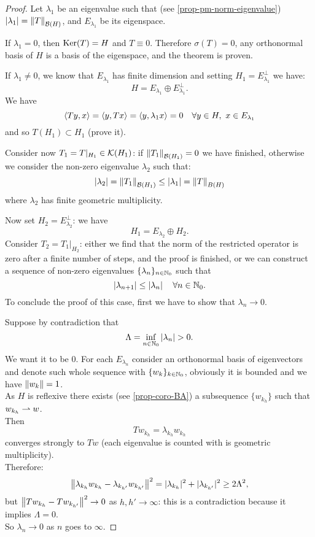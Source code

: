 \begin{proof}
	Let $\lambda_1$ be an eigenvalue such that (see \vref{prop-pm-norm-eigenvalue}) $|\lambda_1|= \left\lVert T\right\rVert_{\mathcal B(H)}$, and $E_{\lambda_1}$ be its eigenspace.
	
	If $\lambda_1 = 0$, then $\operatorname{Ker}(T) = H$ and $T \equiv 0$. Therefore $\sigma(T) = {0}$, any orthonormal basis of $H$ is a basis of the eigenspace, and the theorem is proven.
	
	If $\lambda_1 \neq 0$, we know that $E_{\lambda_1}$ has finite dimension and setting $H_1 = E_{\lambda_1}^\perp$ we have:
	$$
		H
		= E_{\lambda_1} \oplus E_{\lambda_1}^\perp
		.
	$$
	We have
	$$
		\left\langle Ty, x\right\rangle
		= \left\langle y, Tx\right\rangle
		= \left\langle y, \lambda_1x\right\rangle
		= 0
		\quad \forall y \in H, \ x \in E_{\lambda_1}
	$$
	and so $T(H_1) \subset H_1$ (prove it).
	
	Consider now $T_1 = T|_{H_1}\in \mathcal K(H_1)$: if $\left\lVert T_1\right\rVert_{\mathcal B(H_1)} = 0$ we have finished, otherwise we consider the non-zero eigenvalue $\lambda_2$ such that:
	$$
		\left\lvert\lambda_2\right\rvert
		= \left\lVert T_1\right\rVert_{\mathcal B(H_1)}
		\leq \left\lvert\lambda_1\right\rvert
		= \left\lVert T\right\rVert_{B(H)} 
	$$
	where $\lambda_2$ has finite geometric multiplicity.
	
	Now set $H_2 = E_{\lambda_2}^\perp$: we have
	$$
		H_1
		= E_{\lambda_2} \oplus H_2
		.
	$$
	Consider $T_2 = T_1|_{H_2}$: either we find that the norm of the restricted operator is zero after a finite number of steps, and the proof is finished, or we can construct a sequence of non-zero eigenvalues $\{\lambda_n\}_{n \in \mathbb N_0}$ such that
	$$
		\left\lvert\lambda_{n+1}\right\rvert 
		\leq \left\lvert\lambda_n\right\rvert
		\quad \forall n \in \mathbb N_0
		.
	$$
	To conclude the proof of this case, first we have to show that $\lambda_n \to 0$.
	
	Suppose by contradiction that
	$$
		\Lambda 
		= \inf_{n\in \mathbb N_0}\left\lvert\lambda_n\right\rvert 
		> 0
		.
	$$
	We want it to be $0$. For each $E_{\lambda_n}$ consider an orthonormal basis of eigenvectors and denote such whole sequence with $\{w_k\}_{k \in\mathbb N_0}$, obviously it is bounded and we have $\left\lVert w_k\right\rVert=1$. \\
	As $H$ is reflexive there exists (see \vref{prop-coro-BA}) a subsequence $\{w_{k_h}\}$ such that $w_{k_h} \rightharpoonup w$.\\
	Then
	$$
		Tw_{k_h}
		= \lambda_{k_h}w_{k_h}
	$$
	converges strongly to $Tw$ (each eigenvalue is counted with is geometric multiplicity).\\
	Therefore:
	$$
		\left\lVert \lambda_{k_h}w_{k_h} - \lambda_{k_{h'}}w_{k_{h'}} \right\rVert^2 
		= |\lambda_{k_h}|^2+|\lambda_{k_{h'}}|^2
		\geq 2\Lambda^2
		,
	$$
	but $\left\lVert Tw_{k_h}-Tw_{k_{h'}}\right\rVert^2 \to 0$ as $h,h' \to \infty$: this is a contradiction because it implies $\Lambda = 0$.\\
	So $\lambda_n \to 0$ as $n$ goes to $\infty$.
	

\end{proof}
